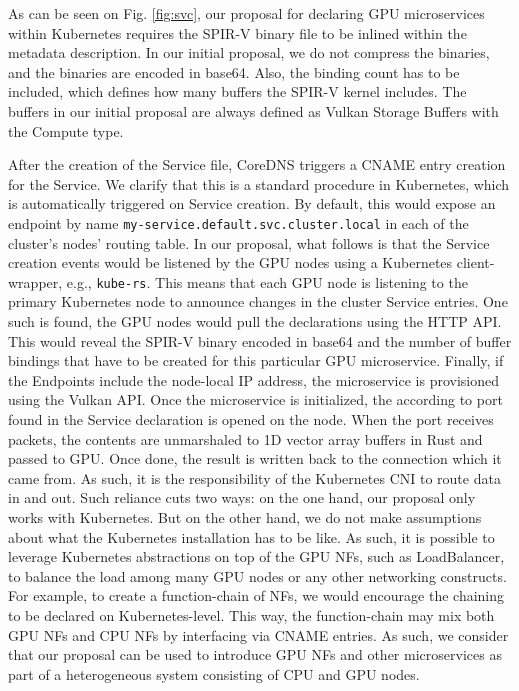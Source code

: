 \documentclass{IEEEtran}
\begin{document}
As can be seen on Fig. \ref{fig:svc}, our proposal for declaring GPU microservices within Kubernetes requires the SPIR-V binary file to be inlined within the metadata description. In our initial proposal, we do not compress the binaries, and the binaries are encoded in base64. Also, the binding count has to be included, which defines how many buffers the SPIR-V kernel includes. The buffers in our initial proposal are always defined as Vulkan Storage Buffers with the Compute type.

After the creation of the Service file, CoreDNS triggers a CNAME entry creation for the Service. We clarify that this is a standard procedure in Kubernetes, which is automatically triggered on Service creation. By default, this would expose an endpoint by name \verb|my-service.default.svc.cluster.local| in each of the cluster's nodes' routing table. In our proposal, what follows is that the Service creation events would be listened by the GPU nodes using a Kubernetes client-wrapper, e.g., \verb|kube-rs|. This means that each GPU node is listening to the primary Kubernetes node to announce changes in the cluster Service entries. One such is found, the GPU nodes would pull the declarations using the HTTP API. This would reveal the SPIR-V binary encoded in base64 and the number of buffer bindings that have to be created for this particular GPU microservice. Finally, if the Endpoints include the node-local IP address, the microservice is provisioned using the Vulkan API. Once the microservice is initialized, the according to port found in the Service declaration is opened on the node. When the port receives packets, the contents are unmarshaled to 1D vector array buffers in Rust and passed to GPU. Once done, the result is written back to the connection which it came from. As such, it is the responsibility of the Kubernetes CNI to route data in and out. Such reliance cuts two ways: on the one hand, our proposal only works with Kubernetes. But on the other hand, we do not make assumptions about what the Kubernetes installation has to be like. As such, it is possible to leverage Kubernetes abstractions on top of the GPU NFs, such as LoadBalancer, to balance the load among many GPU nodes or any other networking constructs. For example, to create a function-chain of NFs, we would encourage the chaining to be declared on Kubernetes-level. This way, the function-chain may mix both GPU NFs and CPU NFs by interfacing via CNAME entries. As such, we consider that our proposal can be used to introduce GPU NFs and other microservices as part of a heterogeneous system consisting of CPU and GPU nodes.
\end{document}
